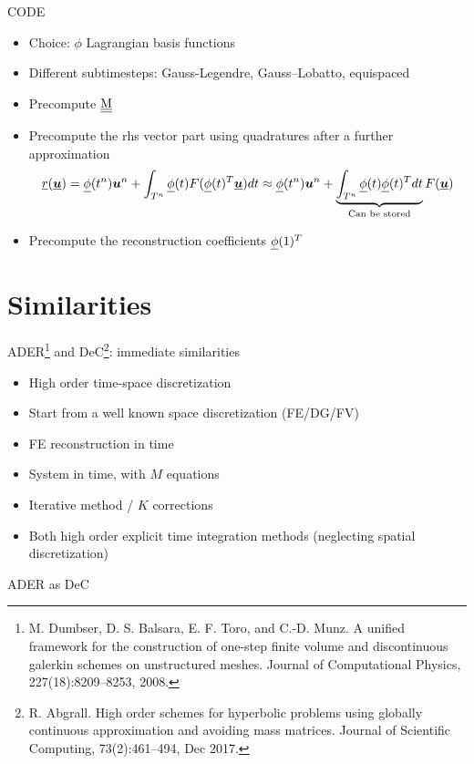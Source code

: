 \documentclass[aspectratio=169]{beamer}
\begin{document}
\begin{frame}{CODE}
	\begin{itemize}
		\item Choice: $\phi$ Lagrangian basis functions
		\item Different subtimesteps: Gauss-Legendre, Gauss--Lobatto, equispaced
		\item Precompute $\underline{\underline{\mathrm{M}}}$
		\item Precompute the rhs vector part using quadratures after a further approximation 
		$$\underline{r}(\underline{\boldsymbol{u}}) =  \underline{\phi}(t^{n}) \boldsymbol{u}^n + \int_{T^n} \underline{\phi}(t)  F(\underline{\phi}(t)^T\underline{\boldsymbol{u}})  dt \approx \underline{\phi}(t^{n}) \boldsymbol{u}^n + \underbrace{\int_{T^n} \underline{\phi}(t)\underline{\phi}(t)^Tdt}_{\text{Can be stored}}  F(\underline{\boldsymbol{u}})  $$
		\item Precompute the reconstruction coefficients $\underline{\phi}(1)^T$
	\end{itemize}
\end{frame}


\section{Similarities}
\begin{frame}{ADER\footnote{M. Dumbser, D. S. Balsara, E. F. Toro, and C.-D. Munz. A unified framework for the construction of one-step finite volume and discontinuous galerkin schemes on unstructured meshes. Journal of Computational Physics, 227(18):8209–8253, 2008.} and DeC\footnote{R. Abgrall. High order schemes for hyperbolic problems using globally continuous approximation and avoiding mass matrices. Journal of Scientific Computing, 73(2):461–494, Dec 2017.}: immediate similarities}
	\begin{itemize}
		\item High order time-space discretization
		\item Start from a well known space discretization (FE/DG/FV)
		\item FE reconstruction in time
		\item System in time, with $M$ equations 
		\item Iterative method / $K$ corrections  
	\end{itemize}
	\pause
	\begin{itemize}
		\item Both high order explicit time integration methods (neglecting spatial discretization)
	\end{itemize}
	
\end{frame}
\begin{frame}{ADER as DeC}

\end{frame}
\end{document}
